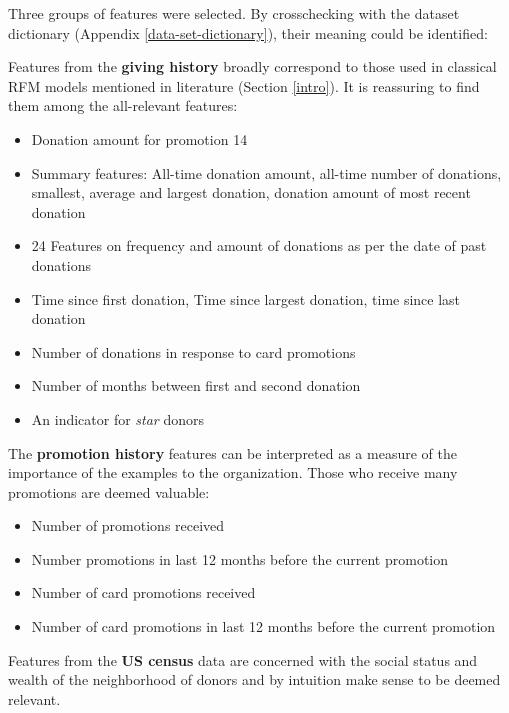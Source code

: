 \documentclass[
  11pt,
  a4paper,
  DIV=12,captions=tableheading,oneside,titlepage]{scrbook}
\providecommand{\tightlist}{%
  \setlength{\itemsep}{0pt}\setlength{\parskip}{0pt}}
\begin{document}
Three groups of features were selected. By crosschecking with the dataset dictionary (Appendix \ref{data-set-dictionary}), their meaning could be identified:

Features from the \textbf{giving history} broadly correspond to those used in classical RFM models mentioned in literature (Section \ref{intro}). It is reassuring to find them among the all-relevant features:

\begin{itemize}
\tightlist
\item
  Donation amount for promotion 14
\item
  Summary features: All-time donation amount, all-time number of donations, smallest, average and largest donation, donation amount of most recent donation
\item
  24 Features on frequency and amount of donations as per the date of past donations
\item
  Time since first donation, Time since largest donation, time since last donation
\item
  Number of donations in response to card promotions
\item
  Number of months between first and second donation
\item
  An indicator for \emph{star} donors
\end{itemize}

The \textbf{promotion history} features can be interpreted as a measure of the importance of the examples to the organization. Those who receive many promotions are deemed valuable:

\begin{itemize}
\tightlist
\item
  Number of promotions received
\item
  Number promotions in last 12 months before the current promotion
\item
  Number of card promotions received
\item
  Number of card promotions in last 12 months before the current promotion
\end{itemize}

Features from the \textbf{US census} data are concerned with the social status and wealth of the neighborhood of donors and by intuition make sense to be deemed relevant.
\end{document}
